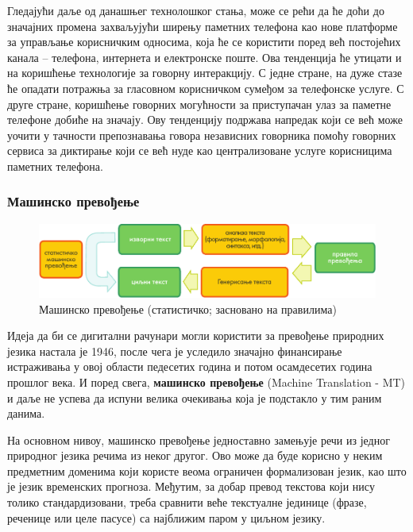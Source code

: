 \begin{multicols}{2}
Гледајући даље од данашњег технолошког стања, може се рећи да ће доћи до значајних промена захваљујући ширењу паметних телефона као нове платформе за управљање корисничким односима, која ће се користити поред већ постојећих канала – телефона, интернета и електронске поште. Ова тенденција ће утицати и на коришћење технологије за говорну интеракцију. С једне стране, на дуже стазе ће опадати потражња за гласовном корисничком сумеђом за телефонске услуге. С друге стране, коришћење говорних могућности за приступачан улаз за паметне телефоне добиће на значају. Ову тенденцију подржава напредак који се већ може уочити у тачности препознавања говора независних говорника помоћу говорних сервиса за диктирање који се већ нуде као централизоване услуге корисницима паметних телефона. 

 \subsubsection {Машинско превођење}
   

\begin{figure}[htb]
  \center
  \includegraphics[width=\textwidth]{../_media/serbian/machine_translation}
  \caption{Машинско превођење (статистичко; засновано на правилима)}
  \label{fig:mtarch_sr}
\end{figure}

Идеја да би се дигитални рачунари могли користити за превођење природних језика настала је 1946, после чега је уследило значајно финансирање истраживања у овој области педесетих година и потом осамдесетих година прошлог века. И поред свега, \textbf{машинско превођење} (Machine Translation - MT) и даље не успева да испуни велика очекивања која је подстакло у тим раним данима. 


На основном нивоу, машинско превођење једноставно замењује речи из једног природног језика речима из неког другог. Ово може да буде корисно у неким предметним доменима који користе веома ограничен формализован језик, као што је језик временских прогноза. Међутим, за добар превод текстова који нису толико стандардизовани, треба сравнити веће текстуалне јединице (фразе, реченице или целе пасусе) са најближим паром у циљном језику. 


\end{multicols}
